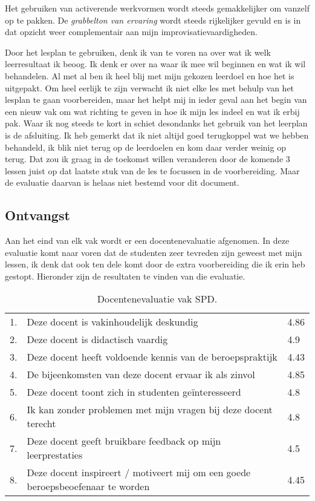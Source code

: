 Het gebruiken van activerende werkvormen wordt steeds gemakkelijker om vanzelf op te pakken. De \textit{grabbelton van ervaring} wordt steeds rijkelijker gevuld en is in dat opzicht weer complementair aan mijn improvisatievaardigheden.

Door het lesplan te gebruiken, denk ik van te voren na over wat ik welk leerresultaat ik beoog. Ik denk er over na waar ik mee wil beginnen en wat ik wil behandelen. Al met al ben ik heel blij met mijn gekozen leerdoel en hoe het is uitgepakt. Om heel eerlijk te zijn verwacht ik niet elke les met behulp van het lesplan te gaan voorbereiden, maar het helpt mij in ieder geval aan het begin van een nieuw vak om wat richting te geven in hoe ik mijn les indeel en wat ik erbij pak.
Waar ik nog steeds te kort in schiet desondanks het gebruik van het leerplan is de afsluiting. Ik heb gemerkt dat ik niet altijd goed terugkoppel wat we hebben behandeld, ik blik niet terug op de leerdoelen en kom daar verder weinig op terug. Dat zou ik graag in de toekomst willen veranderen door de komende 3 lessen juist op dat laatste stuk van de les te focussen in de voorbereiding. Maar de evaluatie daarvan is helaas niet bestemd voor dit document.

\subsection{Ontvangst}
Aan het eind van elk vak wordt er een docentenevaluatie afgenomen. In deze evaluatie komt naar voren dat de studenten zeer tevreden zijn geweest met mijn lessen, ik denk dat ook ten dele komt door de extra voorbereiding die ik erin heb gestopt. Hieronder zijn de resultaten te vinden van die evaluatie.
\begin{table}[h]
  \begin{center}
  \hspace*{-2cm}
  \begin{tabular}{ l | p{10cm} | p{2cm} }
    
    1. & Deze docent is vakinhoudelijk deskundig & 4.86	 \\
    2. & Deze docent is didactisch vaardig	& 4.9 \\
    3. & Deze docent heeft voldoende kennis van de beroepspraktijk	 & 4.43 \\
    4. & De bijeenkomsten van deze docent ervaar ik als zinvol & 4.85 \\ 
    5. & Deze docent toont zich in studenten geïnteresseerd & 4.8 \\
    6. & Ik kan zonder problemen met mijn vragen bij deze docent terecht & 4.8 \\
    7. & Deze docent geeft bruikbare feedback op mijn leerprestaties & 4.5 \\
    8. & Deze docent inspireert / motiveert mij om een goede beroepsbeoefenaar te worden	& 4.45 \\
  \end{tabular}
  \caption{Docentenevaluatie vak SPD.}
  \label{tab:docentenevaluatie}
  \end{center}
\end{table}

